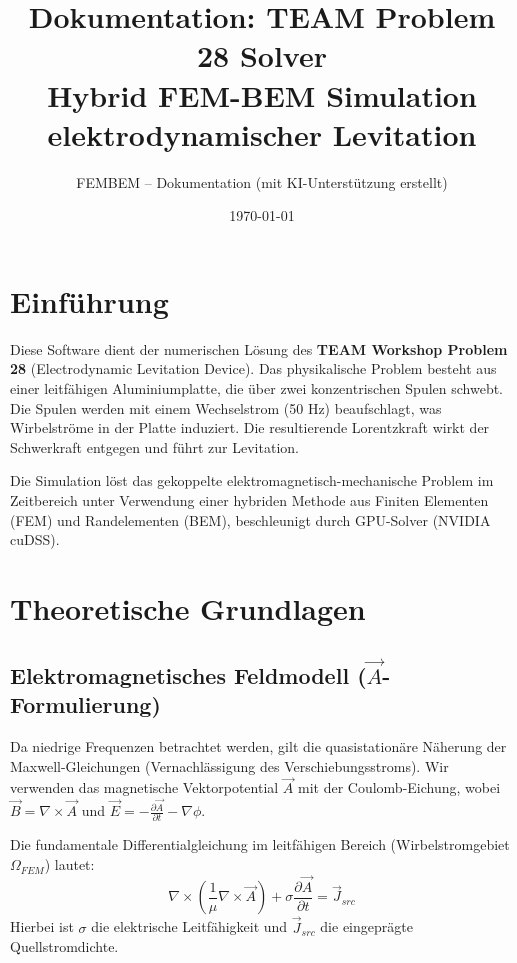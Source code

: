 \documentclass[a4paper,12pt]{article}
\title{\textbf{Dokumentation: TEAM Problem 28 Solver}\\
\large Hybrid FEM-BEM Simulation elektrodynamischer Levitation}
\author{FEMBEM -- Dokumentation (mit KI-Unterstützung erstellt)}
\date{\today}
\begin{document}
\maketitle
\tableofcontents
\newpage

\section{Einführung}
Diese Software dient der numerischen Lösung des \textbf{TEAM Workshop Problem 28} (Electrodynamic Levitation Device). Das physikalische Problem besteht aus einer leitfähigen Aluminiumplatte, die über zwei konzentrischen Spulen schwebt. Die Spulen werden mit einem Wechselstrom (50 Hz) beaufschlagt, was Wirbelströme in der Platte induziert. Die resultierende Lorentzkraft wirkt der Schwerkraft entgegen und führt zur Levitation.

Die Simulation löst das gekoppelte elektromagnetisch-mechanische Problem im Zeitbereich unter Verwendung einer hybriden Methode aus Finiten Elementen (FEM) und Randelementen (BEM), beschleunigt durch GPU-Solver (NVIDIA cuDSS).

\section{Theoretische Grundlagen}

\subsection{Elektromagnetisches Feldmodell ($\vec{A}$-Formulierung)}
Da niedrige Frequenzen betrachtet werden, gilt die quasistationäre Näherung der Maxwell-Gleichungen (Vernachlässigung des Verschiebungsstroms). Wir verwenden das magnetische Vektorpotential $\vec{A}$ mit der Coulomb-Eichung, wobei $\vec{B} = \nabla \times \vec{A}$ und $\vec{E} = -\frac{\partial \vec{A}}{\partial t} - \nabla \phi$.

Die fundamentale Differentialgleichung im leitfähigen Bereich (Wirbelstromgebiet $\Omega_{FEM}$) lautet:
\begin{equation}
    \nabla \times \left( \frac{1}{\mu} \nabla \times \vec{A} \right) + \sigma \frac{\partial \vec{A}}{\partial t} = \vec{J}_{src}
\end{equation}
Hierbei ist $\sigma$ die elektrische Leitfähigkeit und $\vec{J}_{src}$ die eingeprägte Quellstromdichte.
\end{document}
